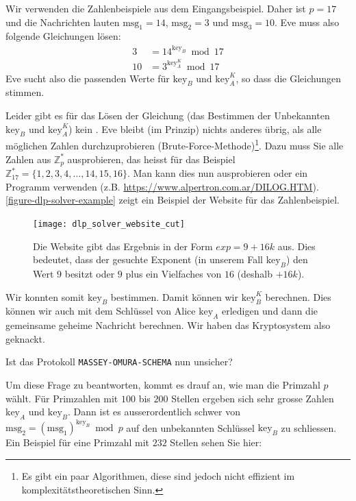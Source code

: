 \begin{example}
	Wir verwenden die Zahlenbeispiele aus dem Eingangsbeispiel. Daher ist $p = 17$ und die Nachrichten lauten $\text{msg}_1 = 14$, $\text{msg}_2 = 3$ und $\text{msg}_3 = 10$. Eve muss also folgende Gleichungen lösen:
\begin{align*}
	3 & = 14^{\text{key}_B} \bmod 17 \\
	10 & = 3^{\text{key}_A^K} \bmod 17
\end{align*}
Eve sucht also die passenden Werte für $\text{key}_B$ und $\text{key}_A^K$, so dass die Gleichungen stimmen.
	
\end{example}

Leider gibt es für das Lösen der Gleichung (das Bestimmen der Unbekannten $\text{key}_B$ und $\text{key}_A^K$) kein . Eve bleibt (im Prinzip) nichts anderes übrig, als alle möglichen Zahlen durchzuprobieren (Brute-Force-Methode)\footnote{Es gibt ein paar  Algorithmen, diese sind jedoch nicht effizient im komplexitätstheoretischen Sinn.}. Dazu muss Sie alle Zahlen aus $\mathbb{Z}_{p}^*$ ausprobieren, das heisst für das Beispiel $\mathbb{Z}_{17}^* = \{1, 2, 3, 4, \dots, 14, 15, 16 \}$. Man kann dies nun  ausprobieren oder ein Programm verwenden (z.B. \url{https://www.alpertron.com.ar/DILOG.HTM}). \autoref{figure-dlp-solver-example} zeigt ein Beispiel der Website für das Zahlenbeispiel.

\begin{figure}[htb]
	\texttt{[image: dlp\_solver\_website\_cut]}
	\caption{Die Website gibt das Ergebnis in der Form $exp = 9 + 16k$ aus. Dies bedeutet, dass der gesuchte Exponent (in unserem Fall $\text{key}_B$) den Wert $9$ besitzt oder $9$ plus ein Vielfaches von $16$ (deshalb $+ 16k$).}
	\label{figure-dlp-solver-example}
\end{figure}

Wir konnten somit $\text{key}_B$ bestimmen. Damit können wir $\text{key}_B^K$ berechnen. Dies können wir auch mit dem Schlüssel von Alice $\text{key}_A$ erledigen und dann die gemeinsame geheime Nachricht berechnen. Wir haben das Kryptosystem also geknackt.

\begin{center}
	Ist das Protokoll \texttt{MASSEY-OMURA-SCHEMA} nun unsicher?
\end{center}

Um diese Frage zu beantworten, kommt es drauf an, wie man die Primzahl $p$ wählt. Für Primzahlen mit $100$ bis $200$ Stellen ergeben sich sehr grosse Zahlen $\text{key}_A$ und $\text{key}_B$. Dann ist es ausserordentlich schwer von $\text{msg}_2 = (\text{msg}_1)^{\text{key}_B} \bmod p$ auf den unbekannten Schlüssel $\text{key}_B$ zu schliessen. Ein Beispiel für eine Primzahl mit $232$ Stellen sehen Sie hier:\\

